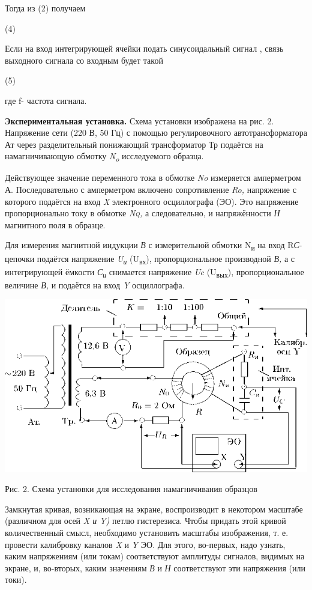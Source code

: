 \documentclass[]{article}
\begin{document}
Тогда из (2) получаем

(4)

Если на вход интегрирующей ячейки подать синусоидальный сигнал , связь
выходного сигнала со входным будет такой

(5)

где f- частота сигнала.

\textbf{Экспериментальная установка.} Схема установки изображена на рис.
2. Напряжение сети (220 В, 50 Гц) с помощью регулировочного
автотрансформатора Ат через разделительный понижающий трансфор­матор Тр
подаётся на намагничивающую обмотку \emph{N\textsubscript{o}}
исследуемого об­разца.

Действующее значение переменного тока в обмотке \emph{No} измеряется
амперметром А. Последовательно с амперметром включено сопротивле­ние
\emph{Ro,} напряжение с которого подаётся на вход \emph{X} электронного
осцил­лографа (ЭО). Это напряжение пропорционально току в обмотке
\emph{\textsc{Nq,}} а следовательно, и напряжённости \emph{Н} магнитного
поля в образце.

Для измерения магнитной индукции \emph{В} с измерительной обмотки
N\textsubscript{и} на вход R\emph{С}-цепочки подаётся напряжение
\emph{U\textsubscript{и}} (U\textsubscript{вх}), пропорциональное
производной \emph{В,} а с интегрирующей ёмкости
\emph{С\textsubscript{и}} снимается напряжение \emph{Uc}
(U\textsubscript{вых}), пропорциональное величине \emph{В,} и подаётся
на вход \emph{Y} осциллографа.

\includegraphics{./media/image8.png}

Рис. 2. Схема установки для исследования намагничивания образцов

Замкнутая кривая, возникающая на экране, воспроизводит в некото­ром
масштабе (различном для осей \emph{X и Y)} петлю гистерезиса. Чтобы
придать этой кривой количественный смысл, необходимо установить масштабы
изображения, т. е. провести калибровку каналов \emph{X} и \emph{Y} ЭО.
Для этого, во-первых, надо узнать, каким напряжениям (или токам)
соответствуют амплитуды сигналов, видимых на экране, и, во-вторых, каким
значениям \emph{В} и \emph{Н} соответствуют эти напряжения (или токи).
\end{document}
